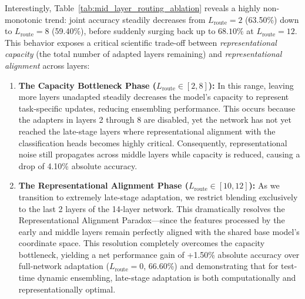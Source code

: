 \begin{itemize}
    Interestingly, Table~\ref{tab:mid_layer_routing_ablation} reveals a highly non-monotonic trend: joint accuracy steadily decreases from $L_{\text{route}}=2$ (63.50\%) down to $L_{\text{route}}=8$ (59.40\%), before suddenly surging back up to $68.10\%$ at $L_{\text{route}}=12$. This behavior exposes a critical scientific trade-off between \emph{representational capacity} (the total number of adapted layers remaining) and \emph{representational alignment} across layers:
    \begin{enumerate}
        \item \textbf{The Capacity Bottleneck Phase ($L_{\text{route}} \in [2, 8]$):} In this range, leaving more layers unadapted steadily decreases the model's capacity to represent task-specific updates, reducing ensembling performance. This occurs because the adapters in layers 2 through 8 are disabled, yet the network has not yet reached the late-stage layers where representational alignment with the classification heads becomes highly critical. Consequently, representational noise still propagates across middle layers while capacity is reduced, causing a drop of 4.10\% absolute accuracy.
        \item \textbf{The Representational Alignment Phase ($L_{\text{route}} \in [10, 12]$):} As we transition to extremely late-stage adaptation, we restrict blending exclusively to the last 2 layers of the 14-layer network. This dramatically resolves the Representational Alignment Paradox—since the features processed by the early and middle layers remain perfectly aligned with the shared base model's coordinate space. This resolution completely overcomes the capacity bottleneck, yielding a net performance gain of +1.50\% absolute accuracy over full-network adaptation ($L_{\text{route}}=0$, 66.60\%) and demonstrating that for test-time dynamic ensembling, late-stage adaptation is both computationally and representationally optimal.
    \end{enumerate}
\end{itemize}
